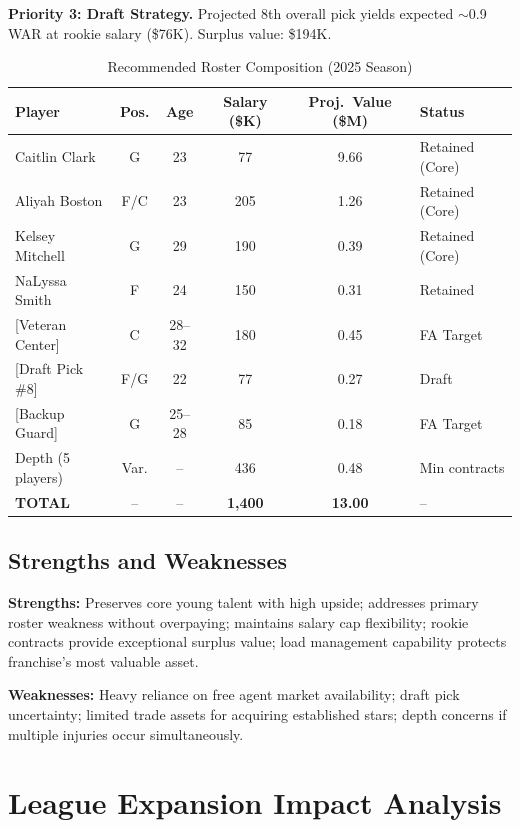 \documentclass{mcmthesis}
\begin{document}
\textbf{Priority 3: Draft Strategy.} Projected 8th overall pick yields expected $\sim$0.9 WAR at rookie salary (\$76K). Surplus value: \$194K.

\begin{table}[H]
\centering
\caption{Recommended Roster Composition (2025 Season)}
\small
\begin{tabular}{lccccl}
\toprule
\textbf{Player} & \textbf{Pos.} & \textbf{Age} & \textbf{Salary (\$K)} & \textbf{Proj.\ Value (\$M)} & \textbf{Status} \\
\midrule
Caitlin Clark & G & 23 & 77 & 9.66 & Retained (Core) \\
Aliyah Boston & F/C & 23 & 205 & 1.26 & Retained (Core) \\
Kelsey Mitchell & G & 29 & 190 & 0.39 & Retained (Core) \\
NaLyssa Smith & F & 24 & 150 & 0.31 & Retained \\
{[Veteran Center]} & C & 28--32 & 180 & 0.45 & FA Target \\
{[Draft Pick \#8]} & F/G & 22 & 77 & 0.27 & Draft \\
{[Backup Guard]} & G & 25--28 & 85 & 0.18 & FA Target \\
Depth (5 players) & Var. & -- & 436 & 0.48 & Min contracts \\
\midrule
\textbf{TOTAL} & -- & -- & \textbf{1,400} & \textbf{13.00} & -- \\
\bottomrule
\end{tabular}
\end{table}

\subsection{Strengths and Weaknesses}
\textbf{Strengths:} Preserves core young talent with high upside; addresses primary roster weakness without overpaying; maintains salary cap flexibility; rookie contracts provide exceptional surplus value; load management capability protects franchise's most valuable asset.

\textbf{Weaknesses:} Heavy reliance on free agent market availability; draft pick uncertainty; limited trade assets for acquiring established stars; depth concerns if multiple injuries occur simultaneously.


\section{League Expansion Impact Analysis}
\end{document}
